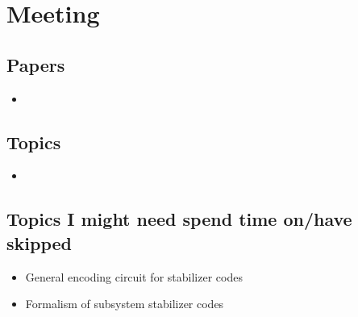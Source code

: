 \section{Meeting}

\subsection{Papers}
\begin{itemize}
    \item
\end{itemize}


\subsection{Topics}
\begin{itemize}
    \item
\end{itemize}


\subsection{Topics I might need spend time on/have skipped}
\begin{itemize}
    \item General encoding circuit for stabilizer codes
    \item Formalism of subsystem stabilizer codes
\end{itemize}